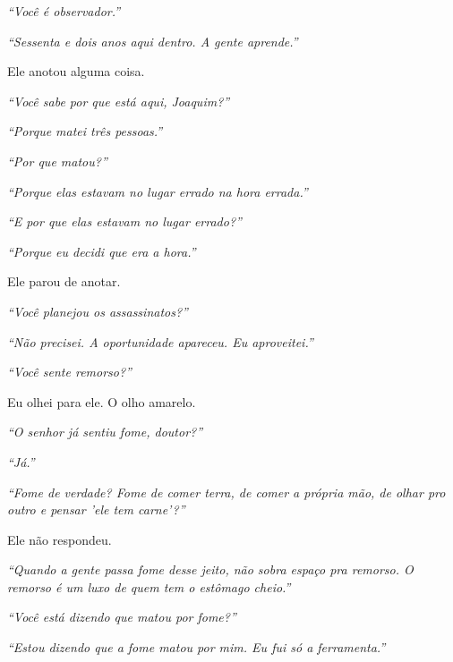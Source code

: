 \noindent \textit{\textquotedblleft{}Você é observador.\textquotedblright{}}

\noindent \textit{\textquotedblleft{}Sessenta e dois anos aqui dentro. A gente aprende.\textquotedblright{}}

\noindent Ele anotou alguma coisa.

\noindent \textit{\textquotedblleft{}Você sabe por que está aqui, Joaquim?\textquotedblright{}}

\noindent \textit{\textquotedblleft{}Porque matei três pessoas.\textquotedblright{}}

\noindent \textit{\textquotedblleft{}Por que matou?\textquotedblright{}}

\noindent \textit{\textquotedblleft{}Porque elas estavam no lugar errado na hora errada.\textquotedblright{}}

\noindent \textit{\textquotedblleft{}E por que elas estavam no lugar errado?\textquotedblright{}}

\noindent \textit{\textquotedblleft{}Porque eu decidi que era a hora.\textquotedblright{}}

\noindent Ele parou de anotar.

\noindent \textit{\textquotedblleft{}Você planejou os assassinatos?\textquotedblright{}}

\noindent \textit{\textquotedblleft{}Não precisei. A oportunidade apareceu. Eu aproveitei.\textquotedblright{}}

\noindent \textit{\textquotedblleft{}Você sente remorso?\textquotedblright{}}

\noindent Eu olhei para ele. O olho amarelo.

\noindent \textit{\textquotedblleft{}O senhor já sentiu fome, doutor?\textquotedblright{}}

\noindent \textit{\textquotedblleft{}Já.\textquotedblright{}}

\noindent \textit{\textquotedblleft{}Fome de verdade? Fome de comer terra, de comer a própria mão, de olhar pro outro e pensar 'ele tem carne'?\textquotedblright{}}

\noindent Ele não respondeu.

\noindent \textit{\textquotedblleft{}Quando a gente passa fome desse jeito, não sobra espaço pra remorso. O remorso é um luxo de quem tem o estômago cheio.\textquotedblright{}}

\noindent \textit{\textquotedblleft{}Você está dizendo que matou por fome?\textquotedblright{}}

\noindent \textit{\textquotedblleft{}Estou dizendo que a fome matou por mim. Eu fui só a ferramenta.\textquotedblright{}}


